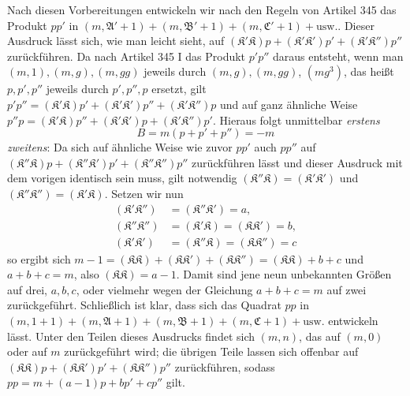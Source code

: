 Nach diesen Vorbereitungen entwickeln wir nach den Regeln von Artikel 345 das Produkt \(pp'\) in \((m,\mathfrak A'+1)+(m,\mathfrak B'+1)+(m,\mathfrak C'+1)+\text{usw.}\). Dieser Ausdruck lässt sich, wie man leicht sieht, auf \((\mathfrak K'\mathfrak K)p+(\mathfrak K'\mathfrak K')p'+(\mathfrak K'\mathfrak K'')p''\) zurückführen. Da nach Artikel 345 I das Produkt \(p'p''\) daraus entsteht, wenn man \((m,1),\allowbreak (m,g),\allowbreak (m,gg)\) jeweils durch \((m,g),\allowbreak (m,gg)\), \((mg^3)\), das heißt \(p,\allowbreak p',\allowbreak p''\) jeweils durch \(p',\allowbreak p'',\allowbreak p\) ersetzt, gilt \(p'p''=(\mathfrak K'\mathfrak K)p'+(\mathfrak K'\mathfrak K')p''+(\mathfrak K'\mathfrak K'')p\) und auf ganz ähnliche Weise \(p''p=(\mathfrak K'\mathfrak K)p''+(\mathfrak K'\mathfrak K')p+(\mathfrak K'\mathfrak K'')p'\). Hieraus folgt unmittelbar \textit{erstens} \[B=m(p+p'+p'')=-m\] \textit{zweitens}: Da sich auf ähnliche Weise wie zuvor \(pp'\) auch \(pp''\) auf \((\mathfrak K''\mathfrak K)p+(\mathfrak K''\mathfrak K')p'+(\mathfrak K''\mathfrak K'')p''\) zurückführen lässt und dieser Ausdruck mit dem vorigen identisch sein muss, gilt notwendig \((\mathfrak K''\mathfrak K)=(\mathfrak K'\mathfrak K')\) und \((\mathfrak K''\mathfrak K'')=(\mathfrak K'\mathfrak K)\). Setzen wir nun \[\begin{aligned}(\mathfrak K'\mathfrak K'')&=(\mathfrak K''\mathfrak K')=a,\\(\mathfrak K''\mathfrak K'')&=(\mathfrak K'\mathfrak K)=(\mathfrak K\mathfrak K')=b,\\(\mathfrak K'\mathfrak K')&=(\mathfrak K''\mathfrak K)=(\mathfrak K\mathfrak K'')=c\end{aligned}\] so ergibt sich \(m-1=(\mathfrak K\mathfrak K)+(\mathfrak K\mathfrak K')+(\mathfrak K\mathfrak K'')=(\mathfrak K\mathfrak K)+b+c\) und \(a+b+c=m\), also \((\mathfrak K\mathfrak K)=a-1\). Damit sind jene neun unbekannten Größen auf drei, \(a,\allowbreak b,\allowbreak c\), oder vielmehr wegen der Gleichung \(a+b+c=m\) auf zwei zurückgeführt. Schließlich ist klar, dass sich das Quadrat \(pp\) in \((m,1+1)+(m,\mathfrak A+1)+(m,\mathfrak B+1)+(m,\mathfrak C+1)+\text{usw.}\) entwickeln lässt. Unter den Teilen dieses Ausdrucks findet sich \((m,n)\), das auf \((m,0)\) oder auf \(m\) zurückgeführt wird; die übrigen Teile lassen sich offenbar auf \((\mathfrak K\mathfrak K)p+(\mathfrak K\mathfrak K')p'+(\mathfrak K\mathfrak K'')p''\) zurückführen, sodass \(pp=m+(a-1)p+bp'+cp''\) gilt.

